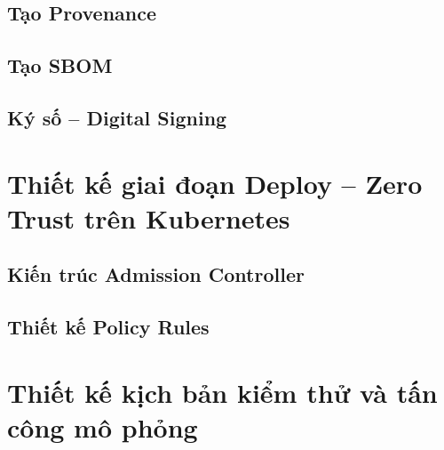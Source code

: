 \subsection{Tạo Provenance}

\subsection{Tạo SBOM}

\subsection{Ký số -- Digital Signing}

\section{Thiết kế giai đoạn Deploy -- Zero Trust trên Kubernetes}

\subsection{Kiến trúc Admission Controller}

\subsection{Thiết kế Policy Rules}

\section{Thiết kế kịch bản kiểm thử và tấn công mô phỏng}

%
